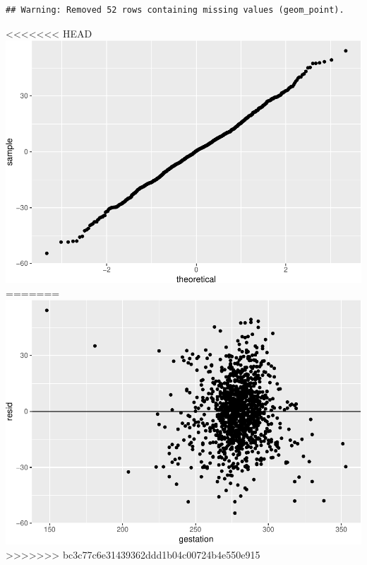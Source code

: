 \documentclass[]{article}
\newenvironment{Shaded}{\begin{snugshade}}{\end{snugshade}}
\newcommand{\DataTypeTok}[1]{\textcolor[rgb]{0.13,0.29,0.53}{#1}}
\newcommand{\DecValTok}[1]{\textcolor[rgb]{0.00,0.00,0.81}{#1}}
\newcommand{\KeywordTok}[1]{\textcolor[rgb]{0.13,0.29,0.53}{\textbf{#1}}}
\newcommand{\NormalTok}[1]{#1}
\newcommand{\OperatorTok}[1]{\textcolor[rgb]{0.81,0.36,0.00}{\textbf{#1}}}
\newcommand{\StringTok}[1]{\textcolor[rgb]{0.31,0.60,0.02}{#1}}
\begin{document}
\begin{verbatim}
## Warning: Removed 52 rows containing missing values (geom_point).
\end{verbatim}

<<<<<<< HEAD
\includegraphics{lab-8-regression_files/figure-latex/unnamed-chunk-18-1.pdf}
=======
\includegraphics{lab-8-regression_files/figure-latex/unnamed-chunk-19-1.pdf}
>>>>>>> bc3c77c6e31439362ddd1b04c00724b4e550e915

\begin{Shaded}
\end{Shaded}
\end{document}
